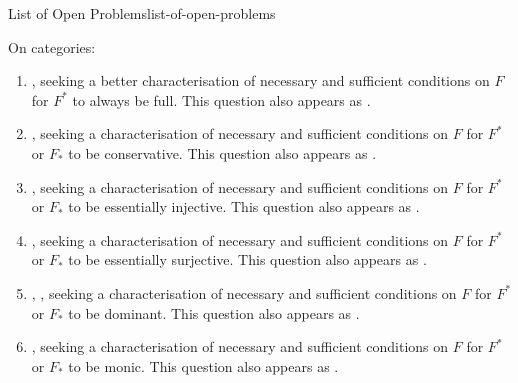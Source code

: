 \begin{remark}{List of Open Problems}{list-of-open-problems}
\begin{enumerate}
    \end{enumerate}
    On categories:
    \begin{enumerate}
        \item {}, seeking a better characterisation of necessary and sufficient conditions on $F$ for $F^{*}$ to always be full. This question also appears as \cite{MO468121}.
        \item {}, seeking a characterisation of necessary and sufficient conditions on $F$ for $F^{*}$ or $F_{*}$ to be conservative. This question also appears as \cite{MO468125}.
        \item {}, seeking a characterisation of necessary and sufficient conditions on $F$ for $F^{*}$ or $F_{*}$ to be essentially injective. This question also appears as \cite{MO468125}.
        \item {}, seeking a characterisation of necessary and sufficient conditions on $F$ for $F^{*}$ or $F_{*}$ to be essentially surjective. This question also appears as \cite{MO468125}.
        \item {}, , seeking a characterisation of necessary and sufficient conditions on $F$ for $F^{*}$ or $F_{*}$ to be dominant. This question also appears as \cite{MO468125}.
        \item {}, seeking a characterisation of necessary and sufficient conditions on $F$ for $F^{*}$ or $F_{*}$ to be monic. This question also appears as \cite{MO468125}.

\end{enumerate}
\end{remark}
